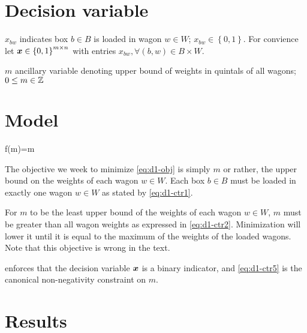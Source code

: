 \section{Decision variable}

\begin{syms}

\item[$x_{bw}$] indicates box $b\in B$ is loaded in wagon $w\in W$; 
    $x_{bw}\in \left\lbrace 0, 1\right\rbrace$. For convience let
    $\boldsymbol{x} \in \left\lbrace 0, 1\right\rbrace^{m\times n}$
    with entries $x_{bw}, \forall (b,w) \in B\times W$.

\item[$m$] ancillary variable denoting upper bound of weights in
    quintals of all wagons;
    $0\leq m\in\mathbb{Z}$
\end{syms}

\section{Model}

\begin{mini!}
    {}{f(m)=m \protect\label{eq:d1-obj}}{\label{eq:d1}}{}
\end{mini!}

The objective we week to minimize \cref{eq:d1-obj} is simply $m$ or rather,
the upper bound on the weights of each wagon $w\in W$. Each box $b\in B$ must
be loaded in exactly one wagon $w\in W$ as stated by \cref{eq:d1-ctr1}. 

For
$m$ to be the least upper bound of the weights of each wagon $w\in W$,
$m$ must be greater than all wagon weights as expressed in \cref{eq:d1-ctr2}. Minimization will lower it until
it is equal to the maximum of the weights of the loaded wagons. Note that this
objective is wrong in the text.

 enforces that the decision variable $\boldsymbol{x}$ is a binary indicator,
and \cref{eq:d1-ctr5} is the canonical non-negativity constraint on $m$.

\section{Results}
